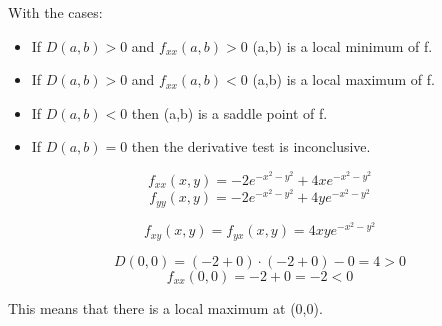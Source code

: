 \documentclass[11pt]{article}
\begin{document}
With the cases:

\begin{itemize}
	\item{If $D(a,b) > 0$ and $f_{xx}(a,b) > 0$  (a,b) is a local minimum of f.}
	\item{If $D(a,b) > 0$ and $f_{xx}(a,b) < 0$  (a,b) is a local maximum of f.}
	\item{If $D(a,b) < 0$ then (a,b) is a saddle point of f.}
	\item{If $D(a,b) = 0$ then the derivative test is inconclusive.}
\end{itemize}
  
\[ f_{xx}(x,y) = -2 e^{-x^2-y^2} + 4 x e^{-x^2-y^2} \]
\[ f_{yy}(x,y) = -2 e^{-x^2-y^2} + 4 y e^{-x^2-y^2} \]

\[ f_{xy}(x,y) = f_{yx}(x,y) = 4 x y e^{-x^2-y^2} \]

\[ D(0,0) = (-2 + 0)\cdot (-2 + 0 ) - 0 = 4 > 0 \]
\[ f_{xx}(0,0) = -2 + 0 = -2 < 0 \]

This means that there is a local maximum at (0,0).


\begin{lstlisting}

\end{lstlisting}
\end{document}
